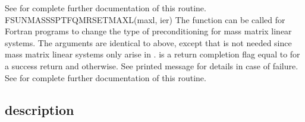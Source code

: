 {
  See  for complete further documentation of
  this routine.
}
{
  FSUNMASSSPTFQMRSETMAXL(maxl, ier)
}
{
  The function  can be called for Fortran
  programs to change the type of preconditioning for mass matrix
  linear systems.
}
{
  The arguments are identical to  above, except that
   is not needed since mass matrix linear systems only arise
  in {\arkode}.
}
{
   is a  return completion flag equal to  for a success
  return and  otherwise. See printed message for details in case
  of failure.
}
{
  See  for complete further documentation of
  this routine.
}

\subsection{{\sunlinsolsptfqmr} description}\label{ss:sunlinsol_sptfqmr_description}


